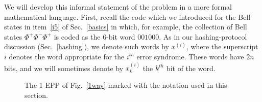 We will develop this informal statement of the problem in a more
formal mathematical language.  First, recall the code which we
introduced for the Bell states in item~\ref{i5} of Sec.~\ref{basics} in
which, for example, the collection of Bell states $\Phi^+\Phi^-\Phi^+$
is coded as the 6-bit word $001000$.  As in our hashing-protocol
discussion (Sec.~\ref{hashing}), we denote such words by $x^{(i)}$,
where the superscript $i$ denotes the word appropriate for the
$i^{th}$ error syndrome.  These words have $2n$ bits, and we will
sometimes denote by $x_k^{(i)}$ the $k^{th}$ bit of the word.
 
\begin{figure}[htbp]
\centerline{}
\caption[EPP12.eps: 1-EPP marked with new notation]
{The 1-EPP of Fig.~\protect\ref{1way} marked with the notation
used in this section.}
\label{1eppmark}
\end{figure}
 
